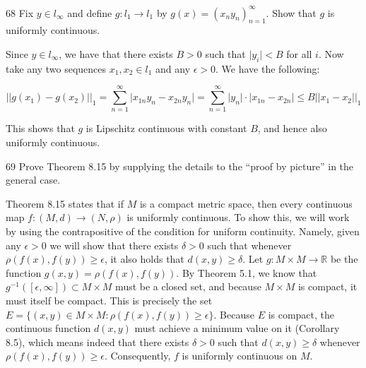 \begin{exercise}{68}
    Fix $y \in l_{\infty}$ and define $g: l_1 \rightarrow l_1$ by $g(x) = (x_ny_n)_{n=1}^{\infty}$.
    Show that $g$ is uniformly continuous.
\end{exercise}

\begin{solution}
    
    Since $y \in l_{\infty}$, we have that there exists $B > 0$ such that $\lvert y_i \rvert < B$ for all $i$.
    Now take any two sequences $x_1, x_2 \in l_1$ and any $\epsilon > 0$.
    We have the following:

    \[\lvert \lvert g(x_1) - g(x_2) \rvert \rvert_1 = \sum_{n=1}^{\infty} \lvert x_{1n}y_n - x_{2n}y_n \rvert = \sum_{n=1}^{\infty} \lvert y_n \rvert \cdot \lvert x_{1n} - x_{2n} \rvert \leq B  \lvert \lvert x_1 - x_2 \rvert \rvert_1\]

    This shows that $g$ is Lipschitz continuous with constant $B$, and hence also uniformly continuous.
\end{solution}

\begin{exercise}{69}
    Prove Theorem 8.15 by supplying the details to the ``proof by picture'' in the general case.
\end{exercise}

\begin{solution}
    Theorem 8.15 states that if $M$ is a compact metric space, then every continuous map $f: (M, d) \rightarrow (N, \rho)$ is uniformly continuous.
    To show this, we will work by using the contrapositive of the condition for uniform continuity.
    Namely, given any $\epsilon > 0$ we will show that there exists $\delta > 0$ such that whenever $\rho(f(x), f(y)) \geq \epsilon$, it also holds that $d(x, y) \geq \delta$.
    Let $g: M \times M \rightarrow \mathbb{R}$ be the function $g(x, y) = \rho(f(x), f(y))$.
    By Theorem 5.1, we know that $g^{-1}([\epsilon, \infty]) \subset M \times M$ must be a closed set, and because $M \times M$ is compact, it must itself be compact.
    This is precisely the set $E = \{(x, y) \in M \times M : \rho(f(x), f(y)) \geq \epsilon\}$.
    Because $E$ is compact, the continuous function $d(x, y)$ must achieve a minimum value on it (Corollary 8.5), which means indeed that there exists $\delta > 0$ such that $d(x, y) \geq \delta$ whenever $\rho(f(x), f(y)) \geq \epsilon$.
    Consequently, $f$ is uniformly continuous on $M$.
\end{solution}

